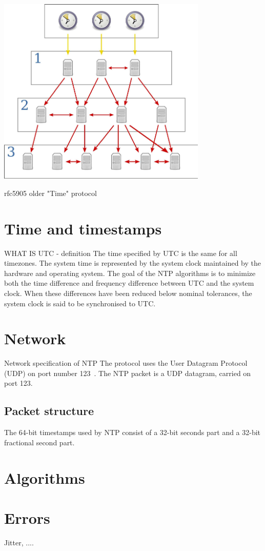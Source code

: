 \includegraphics[width=10cm,keepaspectratio]{fig/Network_Time_Protocol_servers_and_clients.pdf}


\! 
\! rfc5905
\! older "Time" protocol


\section{Time and timestamps}
\!WHAT IS UTC - definition
The time specified by UTC is the same for all timezones.
The system time is represented by the system clock maintained by
the hardware and operating system.
The goal of the NTP algorithms is to minimize
both the time difference and frequency difference between UTC and the system clock.
When these differences have been reduced below nominal
tolerances, the system clock is said to be synchronised to UTC.

\section{Network}\label{sec:ntp-network}
Network specification of NTP 
The protocol uses the User Datagram Protocol (UDP) on port number 123~\cite{ianna-ports}.
The NTP packet is a UDP datagram, carried on port 123.

\subsection{Packet structure}
The 64-bit timestamps used by NTP consist of a 32-bit seconds part and a 32-bit fractional second part.

\section{Algorithms}

\section{Errors}
Jitter, ....
